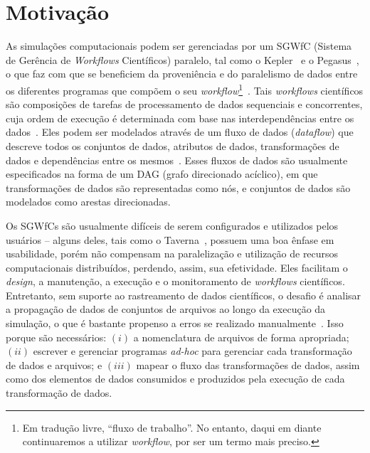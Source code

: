 
\section{Motivação}%
\label{sec:motivacao}

As simulações computacionais podem ser gerenciadas por um  SGWfC (Sistema de Gerência de \textit{Workflows} Científicos) paralelo, tal como o Kepler~\cite{ludascher2006scientific} e o Pegasus~\cite{deelman2005pegasus}, o que faz com que se beneficiem da proveniência e do paralelismo de dados entre os diferentes programas que compõem o seu \textit{workflow}\footnote{Em tradução livre, ``fluxo de trabalho''. No entanto, daqui em diante continuaremos a utilizar \textit{workflow}, por ser um termo mais preciso.}~\cite{bux2013parallelization}.
Tais \textit{workflows} científicos são composições de tarefas de processamento de dados sequenciais e concorrentes, cuja ordem de execução é determinada com base nas interdependências entre os dados~\cite{bux2013parallelization}. Eles podem ser modelados através de um fluxo de dados (\textit{dataflow}) que descreve todos os conjuntos de dados, atributos de dados, transformações de dados e dependências entre os mesmos~\cite{silva2017raw}. Esses fluxos de dados são usualmente especificados na forma de um  DAG (grafo direcionado acíclico), em que transformações de dados são representadas como nós, e conjuntos de dados são modelados como arestas direcionadas.

Os SGWfCs são usualmente difíceis de serem configurados e utilizados pelos usuários -- alguns deles, tais como o Taverna~\cite{hull2006taverna}, possuem uma boa ênfase em usabilidade, porém não compensam na paralelização e utilização de recursos computacionais distribuídos, perdendo, assim, sua efetividade.
Eles facilitam o \textit{design}, a manutenção, a execução e o monitoramento de \textit{workflows} científicos. Entretanto, sem suporte ao rastreamento de dados científicos, o desafio é analisar a propagação de dados de conjuntos de arquivos ao longo da execução da simulação, o que é bastante propenso a erros se realizado manualmente~\cite{silva2015analyzing}. Isso porque são necessários: \( (i) \) a nomenclatura de arquivos de forma apropriada; \( (ii) \) escrever e gerenciar programas \textit{ad-hoc} para gerenciar cada transformação de dados e arquivos; e \( (iii) \) mapear o fluxo das transformações de dados, assim como dos elementos de dados consumidos e produzidos pela execução de cada transformação de dados.

